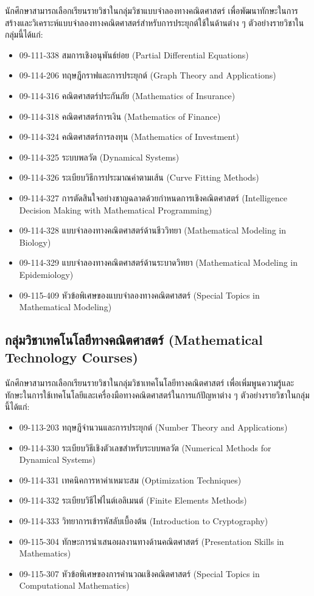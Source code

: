 นักศึกษาสามารถเลือกเรียนรายวิชาในกลุ่มวิชาแบบจำลองทางคณิตศาสตร์ เพื่อพัฒนาทักษะในการสร้างและวิเคราะห์แบบจำลองทางคณิตศาสตร์สำหรับการประยุกต์ใช้ในด้านต่าง ๆ ตัวอย่างรายวิชาในกลุ่มนี้ได้แก่:
\begin{itemize}
    \item 09-111-338 สมการเชิงอนุพันธ์ย่อย (Partial Differential Equations)
    \item 09-114-206 ทฤษฎีกราฟและการประยุกต์ (Graph Theory and Applications)
    \item 09-114-316 คณิตศาสตร์ประกันภัย (Mathematics of Insurance)
    \item 09-114-318 คณิตศาสตร์การเงิน (Mathematics of Finance)
    \item 09-114-324 คณิตศาสตร์การลงทุน (Mathematics of Investment)
    \item 09-114-325 ระบบพลวัต (Dynamical Systems)
    \item 09-114-326 ระเบียบวิธีการประมาณค่าตามเส้น (Curve Fitting Methods)
    \item 09-114-327 การตัดสินใจอย่างชาญฉลาดด้วยกำหนดการเชิงคณิตศาสตร์ (Intelligence Decision Making with Mathematical Programming)
    \item 09-114-328 แบบจำลองทางคณิตศาสตร์ด้านชีววิทยา (Mathematical Modeling in Biology)
    \item 09-114-329 แบบจำลองทางคณิตศาสตร์ด้านระบาดวิทยา (Mathematical Modeling in Epidemiology)
    \item 09-115-409 หัวข้อพิเศษของแบบจำลองทางคณิตศาสตร์ (Special Topics in Mathematical Modeling)
\end{itemize}

\subsection*{กลุ่มวิชาเทคโนโลยีทางคณิตศาสตร์ (Mathematical Technology Courses)}

นักศึกษาสามารถเลือกเรียนรายวิชาในกลุ่มวิชาเทคโนโลยีทางคณิตศาสตร์ เพื่อเพิ่มพูนความรู้และทักษะในการใช้เทคโนโลยีและเครื่องมือทางคณิตศาสตร์ในการแก้ปัญหาต่าง ๆ ตัวอย่างรายวิชาในกลุ่มนี้ได้แก่:
\begin{itemize}
    \item 09-113-203 ทฤษฎีจำนวนและการประยุกต์ (Number Theory and Applications)
    \item 09-114-330 ระเบียบวิธีเชิงตัวเลขสำหรับระบบพลวัต (Numerical Methods for Dynamical Systems)
    \item 09-114-331 เทคนิคการหาค่าเหมาะสม (Optimization Techniques)
    \item 09-114-332 ระเบียบวิธีไฟไนต์เอลิเมนต์ (Finite Elements Methods)
    \item 09-114-333 วิทยาการเข้ารหัสลับเบื้องต้น (Introduction to Cryptography)
    \item 09-115-304 ทักษะการนำเสนอผลงานทางด้านคณิตศาสตร์ (Presentation Skills in Mathematics)
    \item 09-115-307 หัวข้อพิเศษของการคำนวณเชิงคณิตศาสตร์ (Special Topics in Computational Mathematics)
\end{itemize}


